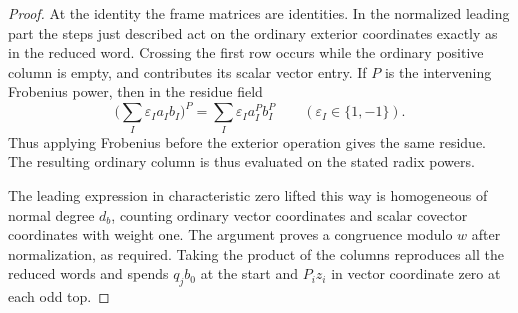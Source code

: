 \begin{proof}
At the identity the frame matrices are identities. In the
normalized leading part the steps just described act on the
ordinary exterior coordinates exactly as in the reduced word.
Crossing the first row occurs while the ordinary positive
column is empty, and contributes its scalar vector entry.
If \(P\) is the intervening Frobenius power, then in the residue field
\[
 \Big(\sum_I\varepsilon_I a_I b_I\Big)^P=\sum_I\varepsilon_I a_I^P b_I^P\qquad(\varepsilon_I\in\{1,-1\}).
\]
Thus applying Frobenius before the exterior operation gives the same residue. The resulting ordinary column is thus evaluated
on the stated radix powers.

The leading expression in
characteristic zero lifted this way is homogeneous of normal
degree \(d_b\), counting ordinary vector coordinates and scalar
covector coordinates with weight one. The argument proves a
congruence modulo \(w\) after normalization, as required.
Taking the product of the columns reproduces all the reduced
words and spends \(q_j b_0\) at the start and \(P_i z_i\)
in vector coordinate zero at each odd top.
\end{proof}
